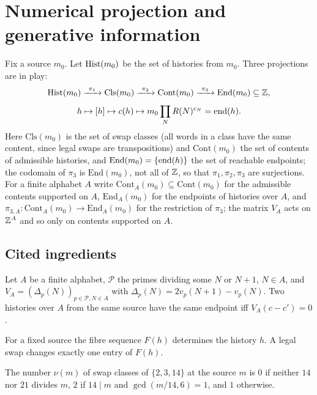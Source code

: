 \section{Numerical projection and generative information}\label{sec:numerical}
Fix a source $m_0$. Let $\mathrm{Hist}(m_0)$ be the set of histories from $m_0$. Three projections are in play:
\[
\Hist(m_0)\xrightarrow{\ \pi_1\ }\mathrm{Cls}(m_0)\xrightarrow{\ \pi_2\ }\mathrm{Cont}(m_0)\xrightarrow{\ \pi_3\ }\mathrm{End}(m_0)\subseteq\Z,
\]
\[
h\mapsto[h]\mapsto c(h)\mapsto m_0\prod_NR(N)^{c_N}=\operatorname{end}(h).
\]
Here $\mathrm{Cls}(m_0)$ is the set of swap classes (all words in a class have the same content, since legal swaps are transpositions) and $\mathrm{Cont}(m_0)$ the set of contents of admissible histories, and $\mathrm{End}(m_0)=\{\operatorname{end}(h)\}$ the set of reachable endpoints; the codomain of $\pi_3$ is $\mathrm{End}(m_0)$, not all of $\mathbb Z$, so that $\pi_1,\pi_2,\pi_3$ are surjections. For a finite alphabet $A$ write $\mathrm{Cont}_A(m_0)\subseteq\mathrm{Cont}(m_0)$ for the admissible contents supported on $A$, $\mathrm{End}_A(m_0)$ for the endpoints of histories over $A$, and $\pi_{3,A}:\mathrm{Cont}_A(m_0)\to\mathrm{End}_A(m_0)$ for the restriction of $\pi_3$; the matrix $V_A$ acts on $\mathbb Z^A$ and so only on contents supported on $A$.

\subsection{Cited ingredients}
\begin{theorem}\label{thm:kernel-cited}
Let $A$ be a finite alphabet, $\mathcal P$ the primes dividing some $N$ or $N+1$, $N\in A$, and $V_A=(\Delta_p(N))_{p\in\mathcal P,N\in A}$ with $\Delta_p(N)=2v_p(N+1)-v_p(N)$. Two histories over $A$ from the same source have the same endpoint iff $V_A(c-c')=0$.
\end{theorem}
\begin{theorem}\label{thm:faith-cited}
For a fixed source the fibre sequence $F(h)$ determines the history $h$. A legal swap changes exactly one entry of $F(h)$.
\end{theorem}
\begin{theorem}\label{thm:2314-cited}
The number $\nu(m)$ of swap classes of $\{2,3,14\}$ at the source $m$ is $0$ if neither $14$ nor $21$ divides $m$, $2$ if $14\mid m$ and $\gcd(m/14,6)=1$, and $1$ otherwise.
\end{theorem}

